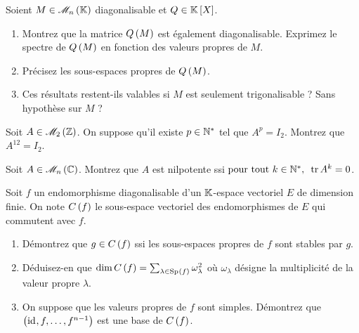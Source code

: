 \begin{exoss}
Soient \(M\in\M{n}\) diagonalisable et \(Q\in\poly\).

\begin{enumerate}
    \item Montrez que la matrice \(Q\left(M\right)\) est également diagonalisable. Exprimez le spectre de \(Q\left(M\right)\) en fonction des valeurs propres de \(M\). \\
    \item Précisez les sous-espaces propres de \(Q\left(M\right)\). \\
    \item Ces résultats restent-ils valables si \(M\) est seulement trigonalisable ? Sans hypothèse sur \(M\) ?
\end{enumerate}
\end{exoss}



\begin{exosss}[Exercice 25]
Soit \(A\in\M{2}[\Z]\). On suppose qu'il existe \(p\in\mathbb{N}^*\) tel que \(A^p=I_2\). Montrez que \(A^{12}=I_2\).
\end{exosss}



\begin{exoss}[Exercice 26]
Soit \(A\in\M{n}[\C]\). Montrez que \(A\) est nilpotente ssi \(\quantifs{\tpt k\in\Ns}\tr A^k=0\).
\end{exoss}



\begin{exoss}[Exercice 27]
Soit \(f\) un endomorphisme diagonalisable d'un \(\mathbb{K}\)-espace vectoriel \(E\) de dimension finie. On note \(C\left(f\right)\) le sous-espace vectoriel des endomorphismes de \(E\) qui commutent avec \(f\).

\begin{enumerate}
    \item Démontrez que \(g\in C\left(f\right)\) ssi les sous-espaces propres de \(f\) sont stables par \(g\). \\
    \item Déduisez-en que \(\dim C\paren{f}=\sum_{\lambda\in\Sp{f}}\omega_\lambda^2\) où \(\omega_\lambda\) désigne la multiplicité de la valeur propre \(\lambda\). \\
    \item On suppose que les valeurs propres de \(f\) sont simples. Démontrez que \(\left(\mathrm{id}_{},f,\dots,f^{n-1}\right)\) est une base de \(C\left(f\right)\).
\end{enumerate}
\end{exoss}



